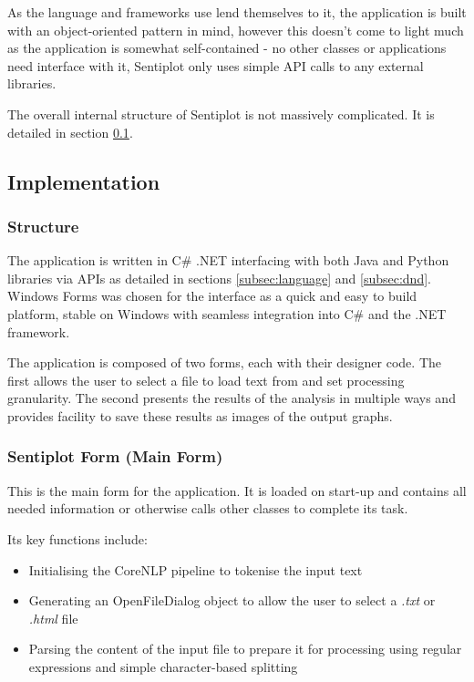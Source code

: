 \documentclass{article}
\begin{document}
        As the language and frameworks use lend themselves to it, the application is built with an object-oriented pattern in mind, however this doesn't come to light much as the application is somewhat self-contained - no other classes or applications need interface with it, Sentiplot only uses simple API calls to any external libraries.

        The overall internal structure of Sentiplot is not massively complicated. It is detailed in section \ref{subsec:implementation}.
    \subsection{Implementation}
    \label{subsec:implementation}
        \subsubsection{Structure}
            The application is written in C\# .NET interfacing with both Java and Python libraries via APIs as detailed in sections \ref{subsec:language} and \ref{subsec:dnd}. Windows Forms was chosen for the interface as a quick and easy to build platform, stable on Windows with seamless integration into C\# and the .NET framework.

            The application is composed of two forms, each with their designer code. The first allows the user to select a file to load text from and set processing granularity. The second presents the results of the analysis in multiple ways and provides facility to save these results as images of the output graphs.
        \subsubsection{Sentiplot Form (Main Form)}
            This is the main form for the application. It is loaded on start-up and contains all needed information or otherwise calls other classes to complete its task.

            Its key functions include:
            \begin{itemize}
                \item Initialising the CoreNLP pipeline to tokenise the input text
                \item Generating an OpenFileDialog object to allow the user to select a \textit{.txt} or \textit{.html} file
                \item Parsing the content of the input file to prepare it for processing using regular expressions and simple character-based splitting
            \end{itemize}
\end{document}
